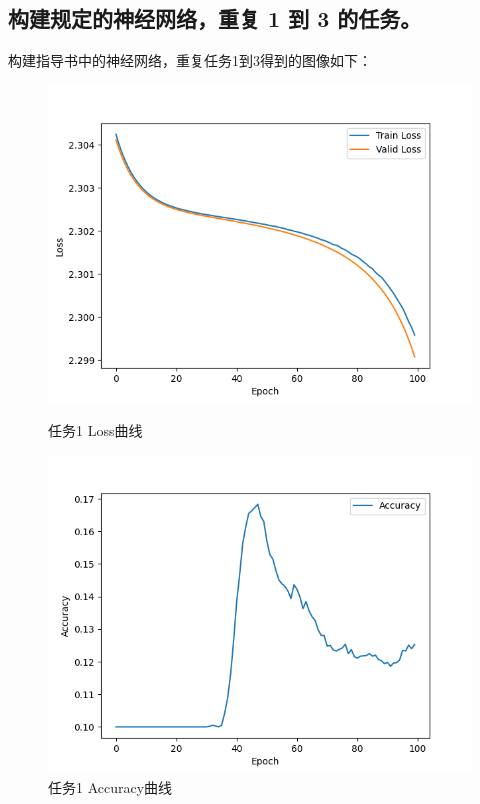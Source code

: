 \documentclass{article}%
\begin{document}
\subsection{构建规定的神经网络，重复 1 到 3 的任务。}
构建指导书中的神经网络，重复任务1到3得到的图像如下：

\begin{figure}[H]
    \centering
    \begin{minipage}{0.49\linewidth}
        \centering
        \includegraphics[width=0.9\linewidth]{Loss_4.png}
        \caption{任务1 Loss曲线}
    \end{minipage}
    \begin{minipage}{0.49\linewidth}
        \centering
        \includegraphics[width=0.9\linewidth]{Acc_4.png}
        \caption{任务1 Accuracy曲线}
    \end{minipage}
\end{figure}
\end{document}

